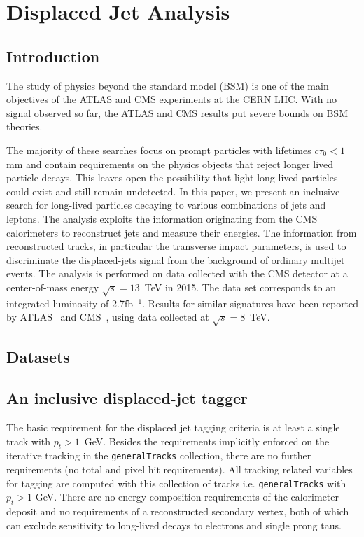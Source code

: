 \chapter{Displaced Jet Analysis \label{ch:analysis}}

\section{Introduction}

The study of physics beyond the standard model (BSM) is one of the main
objectives of the ATLAS and CMS experiments at the CERN LHC. With no
signal observed so far, the ATLAS and CMS results put severe bounds on
BSM theories.

The majority of these searches focus on prompt particles with
lifetimes $c\tau_0<1$mm and contain requirements on the
physics objects that reject longer lived particle
decays. This leaves open the possibility that light long-lived particles
could exist and still remain undetected.  In this paper, we present an
inclusive search for long-lived particles decaying to various
combinations of jets and leptons. The analysis exploits the
information originating from the CMS calorimeters to reconstruct jets
and measure their energies. The information from reconstructed tracks,
in particular the transverse impact parameters, is used to
discriminate the displaced-jets signal from the background of ordinary
multijet events.  The analysis is performed on data collected with the
CMS detector at a center-of-mass energy $\sqrt{s}=13$~TeV in 2015. The
data set corresponds to an integrated luminosity of
2.7fb$^{-1}$. Results for similar signatures have been reported by
ATLAS~\cite{PhysRevD.92.012010,Aad:2015rba} and
CMS~\cite{CMS:2014wda}, using data collected at $\sqrt{s}=8$~TeV.

\section{Datasets} 


\section{An inclusive displaced-jet tagger}


The basic requirement for the displaced jet tagging criteria is at least a single track with $p_{t}>1$~GeV. 
Besides the requirements implicitly enforced on the iterative tracking in the \texttt{generalTracks} collection, there are 
no further requirements (no total and pixel hit requirements). All tracking related variables for tagging are computed
with this collection of tracks i.e. \texttt{generalTracks} with $p_{t}>1$ GeV. 
There are no energy composition requirements of the calorimeter deposit
 and no requirements of a reconstructed secondary vertex, both of which can exclude sensitivity to long-lived decays
to electrons and single prong taus. 

